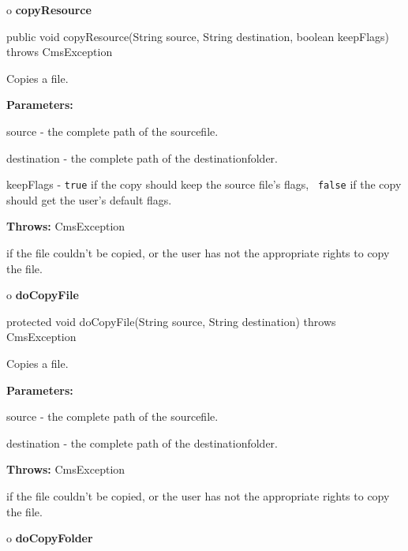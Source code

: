 o {\bf copyResource} 

\begin{PRE}
 public void copyResource(String source,
                          String destination,
                          boolean keepFlags) throws CmsException
\end{PRE}

\begin{description}
\htmlDD Copies a file. 

\begin{description}
\item {\bf Parameters:}  

source - the complete path of the sourcefile.  

destination - the complete path of the destinationfolder.  

keepFlags - {\tt true} if the copy should keep the source file's flags,  {\tt
false} if the copy should get the user's default flags.  
\item {\bf Throws:} CmsException  

if the file couldn't be copied, or the user has not the appropriate rights to
copy the file.  
\end{description}

\end{description}

o {\bf doCopyFile} 

\begin{PRE}
 protected void doCopyFile(String source,
                           String destination) throws CmsException
\end{PRE}

\begin{description}
\htmlDD Copies a file. 

\begin{description}
\item {\bf Parameters:}  

source - the complete path of the sourcefile.  

destination - the complete path of the destinationfolder.  
\item {\bf Throws:} CmsException  

if the file couldn't be copied, or the user has not the appropriate rights to
copy the file.  
\end{description}

\end{description}

o {\bf doCopyFolder} 

